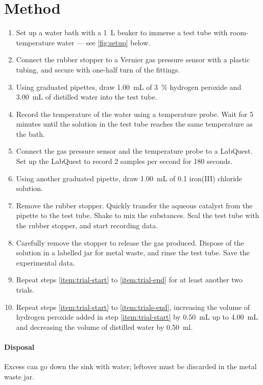 \documentclass[a4paper, 12pt]{article}
\begin{document}
\section*{Method}
\begin{enumerate}
    \item Set up a water bath with a \SI{1}{\L} beaker to immerse a test tube with room-temperature water --- see \cref{fig:setup} below.
    \item Connect the rubber stopper to a Vernier gas pressure sensor with a plastic tubing, and secure with one-half turn of the fittings.
    \item \label{item:trial-start} Using graduated pipettes, draw \SI{1.00}{\mL} of \SI{3}{\%} hydrogen peroxide and \SI{3.00}{\mL} of distilled water into the test tube.
    \item Record the temperature of the water using a temperature probe. Wait for 5 minutes until the solution in the test tube reaches the same temperature as the bath.
    \item Connect the gas pressure sensor and the temperature probe to a LabQuest. Set up the LabQuest to record 2 samples per second for 180 seconds.
    \item Using another graduated pipette, draw \SI{1.00}{\mL} of \SI{0.1}{\molar} iron(III) chloride solution.
    \item Remove the rubber stopper. Quickly transfer the aqueous catalyst from the pipette to the test tube. Shake to mix the substances. Seal the test tube with the rubber stopper, and start recording data.
    \item \label{item:trial-end} Carefully remove the stopper to release the gas produced. Dispose of the solution in a labelled jar for metal waste, and rinse the test tube. Save the experimental data.
    \item \label{item:trials-end} Repeat steps \ref{item:trial-start} to \ref{item:trial-end} for at least another two trials.
    \item Repeat steps \ref{item:trial-start} to \ref{item:trials-end}, increasing the volume of hydrogen peroxide added in step \ref{item:trial-start} by \SI{0.50}{\mL} up to \SI{4.00}{\mL} and decreasing the volume of distilled water by \SI{0.50}{\ml}.
\end{enumerate}
\paragraph{Disposal} Excess  can go down the sink with water; leftover  must be discarded in the metal waste jar.
\end{document}
